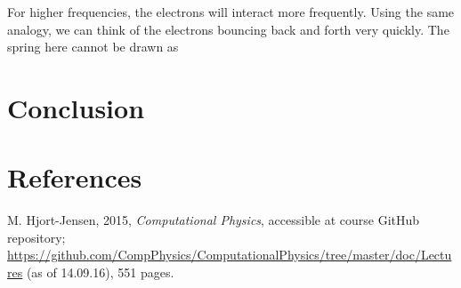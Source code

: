 \documentclass[12pt]{article}
\begin{document}
For higher frequencies, the electrons will interact more frequently. Using the same analogy, we can think of the electrons bouncing back and forth very quickly. The spring here cannot be drawn as 
\section{Conclusion}

\section{References}
M. Hjort-Jensen, 2015, \textit{Computational Physics}, accessible at course GitHub repository; \url{https://github.com/CompPhysics/ComputationalPhysics/tree/master/doc/Lectures} (as of 14.09.16), 551 pages.
\end{document}
